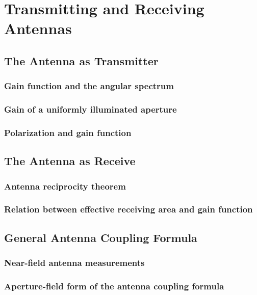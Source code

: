 \chapter{Transmitting and Receiving Antennas}
\label{ch:trre}

\section{The Antenna as Transmitter}
\subsection{Gain function and the angular spectrum}
\subsection{Gain of a uniformly illuminated aperture}
\subsection{Polarization and gain function}

\section{The Antenna as Receive}
\subsection{Antenna reciprocity theorem}
\label{ssec:recitheo}
\subsection{Relation between effective receiving area and gain function}
\label{ssec:gainfunc}

\section{General Antenna Coupling Formula}
\label{sec:coupling}
\subsection{Near-field antenna measurements}
\subsection{Aperture-field form of the antenna coupling formula}